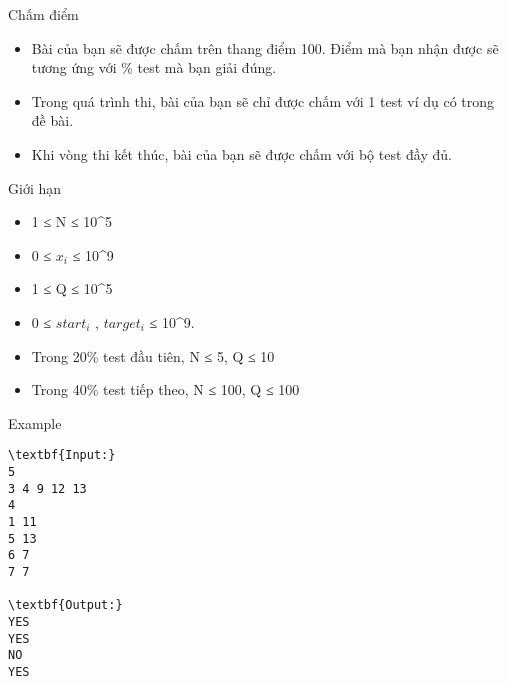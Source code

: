 Chấm điểm
\begin{itemize}
	\item Bài của bạn sẽ được chấm trên thang điểm 100. Điểm mà bạn nhận được sẽ tương ứng với \% test mà bạn giải đúng.
	\item Trong quá trình thi, bài của bạn sẽ chỉ được chấm với 1 test ví dụ có trong đề bài.
	\item Khi vòng thi kết thúc, bài của bạn sẽ được chấm với bộ test đầy đủ.
\end{itemize}
Giới hạn
\begin{itemize}
	\item 1 ≤ N ≤ 10^5
	\item 0 ≤ $x_{i}$ ≤ 10^9
	\item 1 ≤ Q ≤ 10^5
	\item 0 ≤ $start_{i}$ , $target_{i}$ ≤ 10^9.
	\item Trong 20\% test đầu tiên, N ≤ 5, Q ≤ 10
	\item Trong 40\% test tiếp theo, N ≤ 100, Q ≤ 100
\end{itemize}
Example
\begin{verbatim}
\textbf{Input:}
5
3 4 9 12 13
4
1 11
5 13
6 7
7 7

\textbf{Output:}
YES
YES
NO
YES
\end{verbatim}